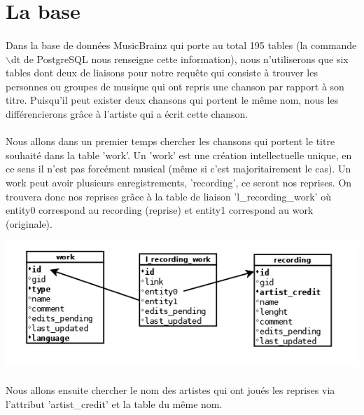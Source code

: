 \documentclass{report}
\begin{document}
	\section*{La base}

		\paragraph{}{
			Dans la base de données MusicBrainz qui porte au total 195 tables (la commande $\backslash$dt de PostgreSQL nous renseigne cette information), nous n’utiliserons que six tables dont deux de liaisons pour notre requête qui consiste à trouver les personnes ou groupes de musique qui ont repris une chanson par rapport à son titre. Puisqu’il peut exister deux chansons qui portent le même nom, nous les différencierons grâce à l’artiste qui a écrit cette chanson.
		}

		\paragraph{}{
			Nous allons dans un premier temps chercher les chansons qui portent le titre souhaité dans la table 'work'. Un 'work' est une création intellectuelle unique, en ce sens il n’est pas forcément musical (même si c’est majoritairement le cas). Un work peut avoir plusieurs enregistrements, 'recording', ce seront nos reprises.  On trouvera donc nos reprises grâce à la table de liaison 'l\_recording\_work' où entity0 correspond au recording (reprise) et entity1 correspond au work (originale).
		}

		\begin{center}
			\includegraphics[scale=.5]{images/work.png}
		\end{center}


		\paragraph{}{
			Nous allons ensuite chercher le nom des artistes qui ont joués les reprises via l’attribut 'artist\_credit' et la table du même nom.
		}
\end{document}

